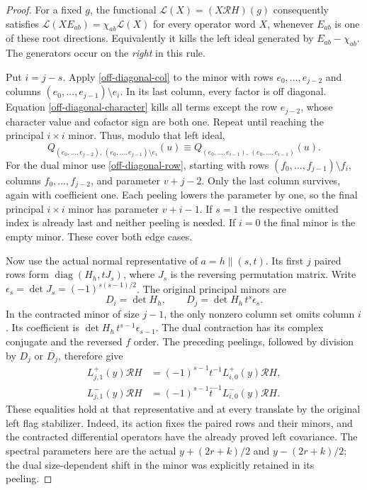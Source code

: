\begin{proof}
For a fixed $g$, the functional
$\mathcal L(X)=(X\mathcal R H)(g)$ consequently satisfies
$\mathcal L(XE_{ab})=\chi_{ab}\mathcal L(X)$ for every
operator word $X$, whenever $E_{ab}$ is one of these
root directions.  Equivalently
it kills the left ideal generated by $E_{ab}-\chi_{ab}$.
The generators occur on the \emph{right} in this rule.

Put $i=j-s$.  Apply \eqref{off-diagonal-col} to the minor
with rows $e_0,\ldots,e_{j-2}$ and columns
$(e_0,\ldots,e_{j-1})\setminus e_i$.
In its last column, every factor is off diagonal.
Equation \eqref{off-diagonal-character} kills all terms
except the row $e_{j-2}$, whose character value and
cofactor sign are both one.  Repeat until reaching
the principal $i\times i$ minor.  Thus, modulo that
left ideal,
\[
 Q_{(e_0,\ldots,e_{j-2}),\,
           (e_0,\ldots,e_{j-1})\setminus e_i}(u)
 \equiv Q_{(e_0,\ldots,e_{i-1}),\,
                        (e_0,\ldots,e_{i-1})}(u).
\]
For the dual minor use \eqref{off-diagonal-row}, starting
with rows $(f_0,\ldots,f_{j-1})\setminus f_i$,
columns $f_0,\ldots,f_{j-2}$, and parameter $v+j-2$.
Only the last column survives, again with coefficient one.
Each peeling lowers the parameter by one, so the final
principal $i\times i$ minor has parameter $v+i-1$.
If $s=1$ the respective omitted index is already last
and neither peeling is needed.  If $i=0$ the final
minor is the empty minor.  These cover both edge cases.

Now use the actual normal representative of
$a=h\mathbin{\|}(s,t)$.  Its first $j$ paired rows form
$\operatorname{diag}(H_h,tJ_s)$, where $J_s$ is the
reversing permutation matrix.  Write
$\epsilon_s=\det J_s=(-1)^{s(s-1)/2}$.
The original principal minors are
\[
 D_i=\det H_h,\qquad D_j=\det H_h\,t^s\epsilon_s.
\]
In the contracted minor of size $j-1$, the only nonzero
column set omits column $i$.  Its coefficient is
$\det H_h\,t^{s-1}\epsilon_{s-1}$.
The dual contraction has its complex conjugate and the
reversed $f$ order.  The preceding peelings, followed by
division by $D_j$ or $\overline{D_j}$, therefore give
\begin{equation}\label{off-diagonal-letter-reduction}
 \begin{split}
 L^+_{j,1}(y)\mathcal R H
    &=(-1)^{s-1}t^{-1}L^+_{i,0}(y)\mathcal R H,\\
 L^-_{j,1}(y)\mathcal R H
    &=(-1)^{s-1}\bar t^{-1}L^-_{i,0}(y)\mathcal R H.
 \end{split}
\end{equation}
These equalities hold at that representative and at
every translate by the original left flag stabilizer.
Indeed, its action fixes the paired rows and their
minors, and the contracted differential operators have
the already proved left covariance.  The spectral
parameters here are the actual $y+(2r+k)/2$ and
$y-(2r+k)/2$; the dual size-dependent shift in the
minor was explicitly retained in its peeling.


\end{proof}
